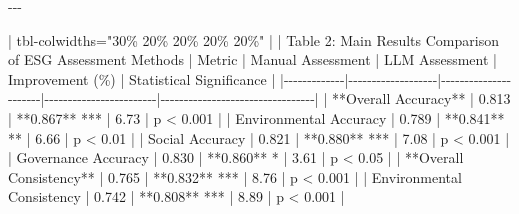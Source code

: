 \documentclass[
  12pt,
]{article}
\newenvironment{Shaded}{\begin{snugshade}}{\end{snugshade}}
\newcommand{\NormalTok}[1]{\textcolor[rgb]{0.00,0.23,0.31}{#1}}
\newcommand{\PreprocessorTok}[1]{\textcolor[rgb]{0.68,0.00,0.00}{#1}}
\begin{document}
\begin{Shaded}
\begin{Highlighting}[]
\NormalTok{{-}{-}{-}}

\PreprocessorTok{|}\NormalTok{ tbl{-}colwidths="30\% 20\% 20\% 20\% 20\%" }\PreprocessorTok{|}
\PreprocessorTok{|}\NormalTok{ Table 2: Main Results Comparison of ESG Assessment Methods  }
\PreprocessorTok{|}\NormalTok{ Metric      }\PreprocessorTok{|}\NormalTok{ Manual Assessment }\PreprocessorTok{|}\NormalTok{ LLM Assessment       }\PreprocessorTok{|}\NormalTok{ Improvement (\%)         }\PreprocessorTok{|}\NormalTok{ Statistical Significance         }\PreprocessorTok{|}
\PreprocessorTok{|{-}{-}{-}{-}{-}{-}{-}{-}{-}{-}{-}{-}{-}|{-}{-}{-}{-}{-}{-}{-}{-}{-}{-}{-}{-}{-}{-}{-}{-}{-}{-}{-}|{-}{-}{-}{-}{-}{-}{-}{-}{-}{-}{-}{-}{-}{-}{-}{-}{-}{-}{-}{-}{-}{-}|{-}{-}{-}{-}{-}{-}{-}{-}{-}{-}{-}{-}{-}{-}{-}{-}{-}{-}{-}{-}{-}{-}{-}{-}|{-}{-}{-}{-}{-}{-}{-}{-}{-}{-}{-}{-}{-}{-}{-}{-}{-}{-}{-}{-}{-}{-}{-}{-}{-}{-}{-}{-}{-}{-}{-}{-}{-}|}
\PreprocessorTok{|}\NormalTok{ **Overall Accuracy**        | 0.813             | **0.867** ***         }\PreprocessorTok{|}\NormalTok{ 6.73                   }\PreprocessorTok{|}\NormalTok{ p \textless{} 0.001                      }\PreprocessorTok{|}
\PreprocessorTok{|}\NormalTok{ Environmental Accuracy      }\PreprocessorTok{|}\NormalTok{ 0.789             }\PreprocessorTok{|}\NormalTok{ **0.841** **          }\PreprocessorTok{|}\NormalTok{ 6.66                   }\PreprocessorTok{|}\NormalTok{ p \textless{} 0.01                       }\PreprocessorTok{|}
\PreprocessorTok{|}\NormalTok{ Social Accuracy             }\PreprocessorTok{|}\NormalTok{ 0.821             }\PreprocessorTok{|}\NormalTok{ **0.880** ***         }\PreprocessorTok{|}\NormalTok{ 7.08                   }\PreprocessorTok{|}\NormalTok{ p \textless{} 0.001                      }\PreprocessorTok{|}
\PreprocessorTok{|}\NormalTok{ Governance Accuracy         }\PreprocessorTok{|}\NormalTok{ 0.830             }\PreprocessorTok{|}\NormalTok{ **0.860** *           }\PreprocessorTok{|}\NormalTok{ 3.61                   }\PreprocessorTok{|}\NormalTok{ p \textless{} 0.05                       }\PreprocessorTok{|}
\PreprocessorTok{|}\NormalTok{ **Overall Consistency**     | 0.765             | **0.832** ***         }\PreprocessorTok{|}\NormalTok{ 8.76                   }\PreprocessorTok{|}\NormalTok{ p \textless{} 0.001                      }\PreprocessorTok{|}
\PreprocessorTok{|}\NormalTok{ Environmental Consistency   }\PreprocessorTok{|}\NormalTok{ 0.742             }\PreprocessorTok{|}\NormalTok{ **0.808** ***         }\PreprocessorTok{|}\NormalTok{ 8.89                   }\PreprocessorTok{|}\NormalTok{ p \textless{} 0.001                      }\PreprocessorTok{|}

\end{Highlighting}
\end{Shaded}
\end{document}
